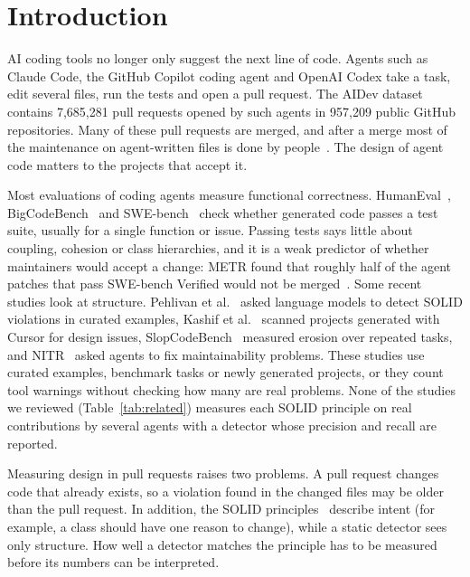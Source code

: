 \documentclass[sigconf]{acmart}
\begin{document}
\maketitle
\pagestyle{plain}

\section{Introduction}
\label{sec:intro}

AI coding tools no longer only suggest the next line of code. Agents such as Claude Code, the GitHub
Copilot coding agent and OpenAI Codex take a task, edit several files, run the tests and open a pull
request. The AIDev dataset~\cite{li2025aidev} contains 7,685,281 pull requests opened by such agents
in 957,209 public GitHub repositories. Many of these pull requests are merged, and after a merge most
of the maintenance on agent-written files is done by people~\cite{sawada2026maintenance}. The design
of agent code matters to the projects that accept it.

Most evaluations of coding agents measure functional correctness. HumanEval~\cite{chen2021codex},
BigCodeBench~\cite{zhuo2024bigcodebench} and SWE-bench~\cite{jimenez2024swebench} check whether
generated code passes a test suite, usually for a single function or issue. Passing tests says little
about coupling, cohesion or class hierarchies, and it is a weak predictor of whether maintainers would
accept a change: METR found that roughly half of the agent patches that pass SWE-bench Verified would
not be merged~\cite{metr2026sweverified}. Some recent studies look at structure. Pehlivan et
al.~\cite{pehlivan2025solid} asked language models to detect SOLID violations in curated examples,
Kashif et al.~\cite{beyond2026designissues} scanned projects generated with Cursor for design issues,
SlopCodeBench~\cite{slopcodebench2026} measured erosion over repeated tasks, and
NITR~\cite{zhu2026nitr} asked agents to fix maintainability problems. These studies use curated
examples, benchmark tasks or newly generated projects, or they count tool warnings without checking
how many are real problems. None of the studies we reviewed (Table~\ref{tab:related}) measures each
SOLID principle on real contributions by several agents with a detector whose precision and recall
are reported.

Measuring design in pull requests raises two problems. A pull request changes code that already
exists, so a violation found in the changed files may be older than the pull request. In addition,
the SOLID principles~\cite{martin2000solid,martin2003agile} describe intent (for example, a class
should have one reason to change), while a static detector sees only structure. How well a detector
matches the principle has to be measured before its numbers can be interpreted.
\end{document}
